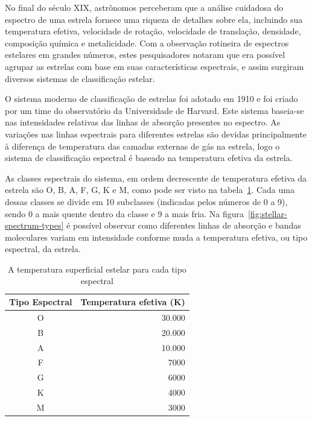 No final do século XIX, astrônomos perceberam que a análise cuidadosa do espectro de uma estrela fornece uma riqueza de detalhes sobre ela, incluindo sua temperatura efetiva, velocidade de rotação, velocidade de translação, densidade, composição química e metalicidade. Com a observação rotineira de espectros estelares em grandes números, estes pesquisadores notaram que era possível agrupar as estrelas com base em suas características espectrais, e assim surgiram diversos sistemas de classificação estelar. 

O sistema moderno de classificação de estrelas foi adotado em 1910 e foi criado por um time do observatório da Universidade de Harvard. Este sistema baseia-se nas intensidades relativas das linhas de absorção presentes no espectro. As variações nas linhas espectrais para diferentes estrelas são devidas principalmente à diferença de temperatura das camadas externas de gás na estrela, logo o sistema de classificação espectral é baseado na temperatura efetiva da estrela. 

As classes espectrais do sistema, em ordem decrescente de temperatura efetiva da estrela são O, B, A, F, G, K e M, como pode ser visto na tabela~\ref{tab:stellar-temperatures}. Cada uma dessas classes se divide em 10 subclasses (indicadas pelos números de 0 a 9), sendo 0 a mais quente dentro da classe e 9 a mais fria.
Na figura~\ref{fig:stellar-spectrum-types} é possível observar como diferentes linhas de absorção e bandas moleculares variam em intensidade conforme muda a temperatura efetiva, ou tipo espectral, da estrela.

\begin{table}[htb]
\centering
\begin{tabular}{|c|r|}
\hline
\textbf{Tipo Espectral} & \textbf{Temperatura efetiva (K)} \\ \hline
O                       & 30.000                               \\ \hline
B                       & 20.000                               \\ \hline
A                       & 10.000                               \\ \hline
F                       & 7000                                 \\ \hline
G                       & 6000                                 \\ \hline
K                       & 4000                                 \\ \hline
M                       & 3000                                 \\ \hline
\end{tabular}
\caption{A temperatura superficial estelar para cada tipo espectral \citep{iag-stellar-temps}}\label{tab:stellar-temperatures}
\end{table}

